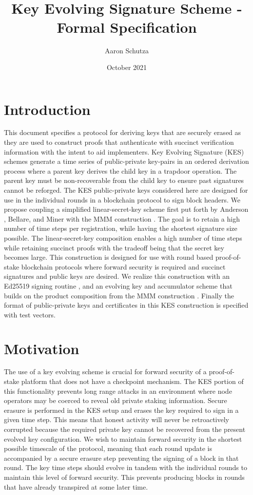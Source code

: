\documentclass{article}
\title{Key Evolving Signature Scheme - Formal Specification}
\author{Aaron Schutza }
\date{October 2021}
\begin{document}
\maketitle

\section{Introduction}
This document specifies a protocol for deriving keys that are securely erased as they are used to construct proofs that authenticate with succinct verification information with the intent to aid implementers. Key Evolving Signature (KES) schemes generate a time series of public-private key-pairs in an ordered derivation process where a parent key derives the child key in a trapdoor operation.  The parent key must be non-recoverable from the child key to ensure past signatures cannot be reforged.  The KES public-private keys considered here are designed for use in the individual rounds in a blockchain protocol to sign block headers.  We propose coupling a simplified linear-secret-key scheme first put forth by Anderson \cite{Anderson1997}, Bellare, and Miner \cite{BM1999} with the MMM construction \cite{MMM}. The goal is to retain a high number of time steps per registration, while having the shortest signature size possible.  The linear-secret-key composition enables a high number of time steps while retaining succinct proofs with the tradeoff being that the secret key becomes large.  This construction is designed for use with round based proof-of-stake blockchain protocols where forward security is required and succinct signatures and public keys are desired.  We realize this construction with an Ed25519 signing routine \cite{ed25519}, and an evolving key and accumulator scheme that builds on the product composition from the MMM construction \cite{MMM}.  Finally the format of public-private keys and certificates in this KES construction is specified with test vectors.

\section{Motivation}
 The use of a key evolving scheme is crucial for forward security of a proof-of-stake platform that does not have a checkpoint mechanism.  
 The KES portion of this functionality prevents long range attacks in an environment where node operators may be coerced to reveal old private staking information.  
 Secure erasure is performed in the KES setup and erases the key required to sign in a given time step. 
 This means that honest activity will never be retroactively corrupted because the required private key cannot be recovered from the present evolved key configuration.  
 We wish to maintain forward security in the shortest possible timescale of the protocol, meaning that each round update is accompanied by a secure erasure step preventing the signing of a block in that round. 
 The key time steps should evolve in tandem with the individual rounds to maintain this level of forward security.
 This prevents producing blocks in rounds that have already transpired at some later time.
 
\end{document}
